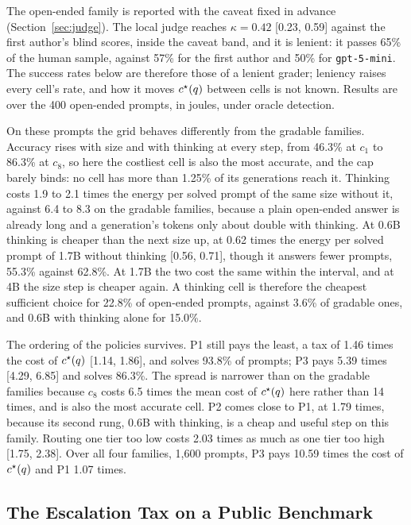 The open-ended family is reported with the caveat fixed in advance
(Section~\ref{sec:judge}). The local judge reaches $\kappa = 0.42$ [0.23,
0.59] against the first author's blind scores, inside the caveat band, and
it is lenient: it passes 65\% of the human sample, against 57\% for the
first author and 50\% for \texttt{gpt-5-mini}. The success rates below are
therefore those of a lenient grader; leniency raises every cell's rate, and
how it moves $c^{\star}(q)$ between cells is not known. Results are over the
400 open-ended prompts, in joules, under oracle detection.

On these prompts the grid behaves differently from the gradable families.
Accuracy rises with size and with thinking at every step, from 46.3\% at
$c_1$ to 86.3\% at $c_8$, so here the costliest cell is also the most
accurate, and the cap barely binds: no cell has more than 1.25\% of its
generations reach it. Thinking costs 1.9 to 2.1 times the energy per solved
prompt of the same size without it, against 6.4 to 8.3 on the gradable
families, because a plain open-ended answer is already long and a
generation's tokens only about double with thinking. At 0.6B thinking is
cheaper than the next size up, at 0.62 times the energy per solved prompt of
1.7B without thinking [0.56, 0.71], though it answers fewer prompts, 55.3\%
against 62.8\%. At 1.7B the two cost the same within the interval, and at 4B
the size step is cheaper again. A thinking cell is therefore the cheapest
sufficient choice for 22.8\% of open-ended prompts, against 3.6\% of gradable
ones, and 0.6B with thinking alone for 15.0\%.

The ordering of the policies survives. P1 still pays the least, a tax of
1.46 times the cost of $c^{\star}(q)$ [1.14, 1.86], and solves 93.8\% of
prompts; P3 pays 5.39 times [4.29, 6.85] and solves 86.3\%. The spread is
narrower than on the gradable families because $c_8$ costs 6.5 times the
mean cost of $c^{\star}(q)$ here rather than 14 times, and is also the most
accurate cell. P2 comes close to P1, at 1.79 times, because its second rung,
0.6B with thinking, is a cheap and useful step on this family. Routing one
tier too low costs 2.03 times as much as one tier too high [1.75, 2.38].
Over all four families, 1{,}600 prompts, P3 pays 10.59 times the cost of
$c^{\star}(q)$ and P1 1.07 times.

\subsection{The Escalation Tax on a Public Benchmark}
\label{sec:results-public}

